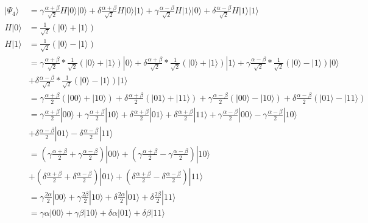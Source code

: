 \documentclass{article}
\begin{document}
\begin{equation}
\begin{split}
    |\Psi_4\rangle & = \gamma\frac{\alpha + \beta}{\sqrt{2}}H|0\rangle|0\rangle
        + \delta\frac{\alpha + \beta}{\sqrt{2}}H|0\rangle|1\rangle
        + \gamma\frac{\alpha - \beta}{\sqrt{2}}H|1\rangle|0\rangle
        + \delta\frac{\alpha - \beta}{\sqrt{2}}H|1\rangle|1\rangle \\
        H|0\rangle & = \frac{1}{\sqrt{2}}(|0\rangle + |1\rangle) \\
        H|1\rangle & = \frac{1}{\sqrt{2}}(|0\rangle - |1\rangle) \\
    & = \gamma\frac{\alpha + \beta}{\sqrt{2}}*\frac{1}{\sqrt{2}}(|0\rangle + |1\rangle)|0\rangle
        + \delta\frac{\alpha + \beta}{\sqrt{2}}*\frac{1}{\sqrt{2}}(|0\rangle + |1\rangle)|1\rangle
        + \gamma\frac{\alpha - \beta}{\sqrt{2}}*\frac{1}{\sqrt{2}}(|0\rangle - |1\rangle)|0\rangle \\
        & + \delta\frac{\alpha - \beta}{\sqrt{2}}*\frac{1}{\sqrt{2}}(|0\rangle - |1\rangle)|1\rangle \\
    & = \gamma\frac{\alpha + \beta}{2}(|00\rangle + |10\rangle)
        + \delta\frac{\alpha + \beta}{2}(|01\rangle + |11\rangle)
        + \gamma\frac{\alpha - \beta}{2}(|00\rangle - |10\rangle)
        + \delta\frac{\alpha - \beta}{2}(|01\rangle - |11\rangle) \\
    & = \gamma\frac{\alpha + \beta}{2}|00\rangle + \gamma\frac{\alpha + \beta}{2}|10\rangle
        + \delta\frac{\alpha + \beta}{2}|01\rangle + \delta\frac{\alpha + \beta}{2}|11\rangle
        + \gamma\frac{\alpha - \beta}{2}|00\rangle - \gamma\frac{\alpha - \beta}{2}|10\rangle \\
        & + \delta\frac{\alpha - \beta}{2}|01\rangle - \delta\frac{\alpha - \beta}{2}|11\rangle \\
    & = (\gamma\frac{\alpha + \beta}{2} + \gamma\frac{\alpha - \beta}{2})|00\rangle
        + (\gamma\frac{\alpha + \beta}{2} - \gamma\frac{\alpha - \beta}{2})|10\rangle \\
        & + (\delta\frac{\alpha + \beta}{2} + \delta\frac{\alpha - \beta}{2})|01\rangle
        + (\delta\frac{\alpha + \beta}{2} - \delta\frac{\alpha - \beta}{2})|11\rangle \\
    & = \gamma\frac{2\alpha}{2}|00\rangle + \gamma\frac{2\beta}{2}|10\rangle
        + \delta\frac{2\alpha}{2}|01\rangle + \delta\frac{2\beta}{2}|11\rangle \\
    & = \gamma\alpha|00\rangle + \gamma\beta|10\rangle + \delta\alpha|01\rangle + \delta\beta|11\rangle \\

\end{split}
\end{equation}
\end{document}
